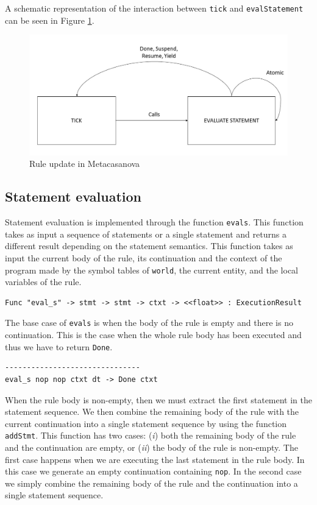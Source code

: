 A schematic representation of the interaction between \texttt{tick} and \texttt{evalStatement} can be seen in Figure \ref{fig:ch_mcnv_languages_rule_update}.

\begin{figure}
	\centering
	\includegraphics[width=\textwidth]{Figures/statement_evaluation}
	\caption{Rule update in Metacasanova}
	\label{fig:ch_mcnv_languages_rule_update}
\end{figure}

\subsection{Statement evaluation}
Statement evaluation is implemented through the function \texttt{eval\tu s}. This function takes as input a sequence of statements or a single statement and returns a different result depending on the statement semantics. This function takes as input the current body of the rule, its continuation and the context of the program made by the symbol tables of \texttt{world}, the current entity, and the local variables of the rule.

\begin{lstlisting}
Func "eval_s" -> stmt -> stmt -> ctxt -> <<float>> : ExecutionResult
\end{lstlisting}

\noindent
The base case of \texttt{eval\tu s} is when the body of the rule is empty and there is no continuation. This is the case when the whole rule body has been executed and thus we have to return \texttt{Done}.

\begin{lstlisting}
-------------------------------
eval_s nop nop ctxt dt -> Done ctxt
\end{lstlisting}

\noindent
When the rule body is non-empty, then we must extract the first statement in the statement sequence. We then combine the remaining body of the rule with the current continuation into a single statement sequence by using the function \texttt{addStmt}. This function has two cases: (\textit{i}) both the remaining body of the rule and the continuation are empty, or (\textit{ii}) the body of the rule is non-empty. The first case happens when we are executing the last statement in the rule body. In this case we generate an empty continuation containing \texttt{nop}. In the second case we simply combine the remaining body of the rule and the continuation into a single statement sequence.

